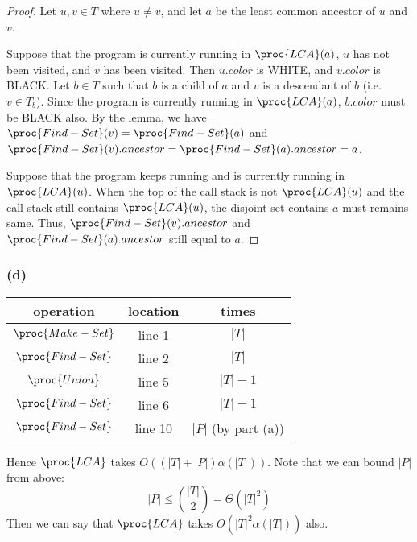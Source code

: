 \begin{proof}
    Let $u, v \in T$ where $u \neq v$, and let $a$ be the least common ancestor of $u$ and $v$.

    Suppose that the program is currently running in $\proc{LCA}(a)$,
    $u$ has not been visited, and $v$ has been visited.
    Then $u.color$ is WHITE, and $v.color$ is BLACK.
    Let $b \in T$ such that $b$ is a child of $a$ and $v$ is a descendant of $b$ 
    (i.e. $v \in T_b$). 
    Since the program is currently running in $\proc{LCA}(a)$,
    $b.color$ must be BLACK also.
    By the lemma, we have $\proc{Find-Set}(v) = \proc{Find-Set}(a)$
    and $\proc{Find-Set}(v).ancestor = \proc{Find-Set}(a).ancestor = a$. 

    Suppose that the program keeps running and is currently running in $\proc{LCA}(u)$.
    When the top of the call stack is not $\proc{LCA}(u)$ 
    and the call stack still contains $\proc{LCA}(u)$,
    the disjoint set contains $a$ must remains same.
    Thus, $\proc{Find-Set}(v).ancestor$ and $\proc{Find-Set}(a).ancestor$ still equal to $a$.
\end{proof}

\subsubsection*{(d)}

\begin{tabular}{c|c|c}
    operation & location & times \\
    \hline
    $\proc{Make-Set}$ & line 1 & $|T|$ \\
    $\proc{Find-Set}$ & line 2 & $|T|$ \\
    $\proc{Union}$ & line 5 & $|T| - 1$ \\
    $\proc{Find-Set}$ & line 6 & $|T| - 1$ \\
    $\proc{Find-Set}$ & line 10 & $|P|$ (by part (a)) \\
\end{tabular}

Hence $\proc{LCA}$ takes $O((|T| + |P|) \alpha(|T|))$.
Note that we can bound $|P|$ from above:
\begin{equation*}
    |P| \leq \binom{|T|}{2} = \Theta(|T|^2)
\end{equation*}
Then we can say that $\proc{LCA}$ takes $O(|T|^2 \alpha(|T|))$ also.


